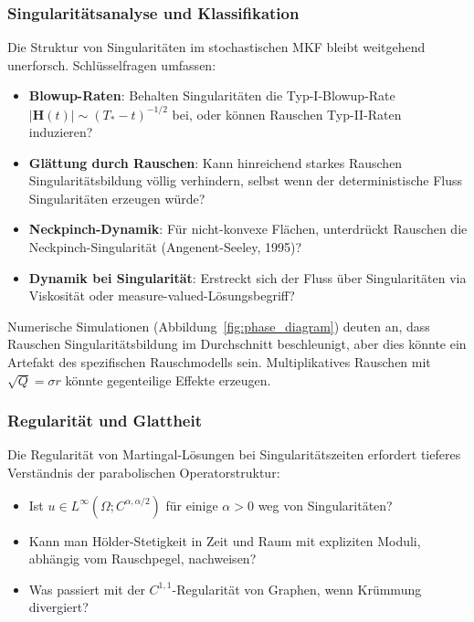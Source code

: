 \documentclass[a4paper,12pt]{article}
\theoremstyle{definition}
\begin{document}
\subsubsection{Singularitätsanalyse und Klassifikation}

Die Struktur von Singularitäten im stochastischen MKF bleibt weitgehend unerforsch. Schlüsselfragen umfassen:

\begin{itemize}
	\item \textbf{Blowup-Raten}: Behalten Singularitäten die Typ-I-Blowup-Rate $|\mathbf{H}(t)| \sim (T_* - t)^{-1/2}$ bei, oder können Rauschen Typ-II-Raten induzieren?
	\item \textbf{Glättung durch Rauschen}: Kann hinreichend starkes Rauschen Singularitätsbildung völlig verhindern, selbst wenn der deterministische Fluss Singularitäten erzeugen würde?
	\item \textbf{Neckpinch-Dynamik}: Für nicht-konvexe Flächen, unterdrückt Rauschen die Neckpinch-Singularität (Angenent-Seeley, 1995)?
	\item \textbf{Dynamik bei Singularität}: Erstreckt sich der Fluss über Singularitäten via Viskosität oder measure-valued-Lösungsbegriff?
\end{itemize}

Numerische Simulationen (Abbildung~\ref{fig:phase_diagram}) deuten an, dass Rauschen Singularitätsbildung im Durchschnitt beschleunigt, aber dies könnte ein Artefakt des spezifischen Rauschmodells sein. Multiplikatives Rauschen mit $\sqrt{Q} = \sigma r$ könnte gegenteilige Effekte erzeugen.

\subsubsection{Regularität und Glattheit}

Die Regularität von Martingal-Lösungen bei Singularitätszeiten erfordert tieferes Verständnis der parabolischen Operatorstruktur:

\begin{itemize}
	\item Ist $u \in L^\infty(\Omega; C^{\alpha,\alpha/2})$ für einige $\alpha > 0$ weg von Singularitäten?
	\item Kann man Hölder-Stetigkeit in Zeit und Raum mit expliziten Moduli, abhängig vom Rauschpegel, nachweisen?
	\item Was passiert mit der $C^{1,1}$-Regularität von Graphen, wenn Krümmung divergiert?
\end{itemize}
\end{document}
